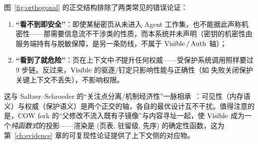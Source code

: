 图~\ref{fig:orthogonal} 的正交结构排除了两类常见的错误论证：
\begin{enumerate}[itemsep=0.1em]
  \item \textbf{“看不到即安全”}：即使某秘密页从未进入 Agent 工作集，也不能据此声称机密性——那需要信息流不干涉类的性质，而本系统并未声明（密钥的机密性由服务端持有与脱敏保障，是另一条防线，不属于 $\operatorname{Visible}/\operatorname{Auth}$ 轴）；
  \item \textbf{“看到了就危险”}：页在上下文中\emph{不}提升任何权威——受保护系统调用照样要过 9 步链。反过来，$\operatorname{Visible}$ 的驱逐/钉定只影响性能与正确性（如  失败关闭保护关键上下文不丢失），不影响权限。
\end{enumerate}
这与 Saltzer--Schroeder 的“关注点分离/机制经济性”一脉相承~\cite{saltzer1975}：可见性（内存语义）与权威（保护语义）是两个正交的轴，各自的最优设计互不干扰。值得注意的是，COW fork 的“父修改不流入既有子镜像”与内容寻址一起，使 $\operatorname{Visible}$ 成为一个\emph{纯函数式}的投影——渲染是 (页表, 驻留级, 先序) 的确定性函数，这为第~\ref{ch:evidence} 章的可复现性论证提供了上下文侧的对应物。
